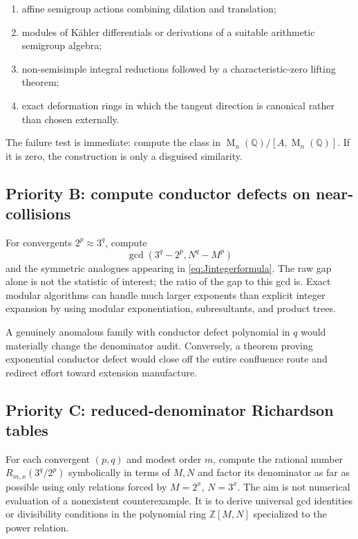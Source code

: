 \documentclass[11pt,oneside]{article}
\theoremstyle{definition}
\theoremstyle{remark}
\newcommand{\Z}{\mathbb Z}
\newcommand{\Q}{\mathbb Q}
\newcommand{\Mat}{\operatorname{M}}
\begin{document}
\begin{enumerate}
\item affine semigroup actions combining dilation and translation;
\item modules of K\"ahler differentials or derivations of a suitable arithmetic semigroup
algebra;
\item non-semisimple integral reductions followed by a characteristic-zero lifting theorem;
\item exact deformation rings in which the tangent direction is canonical rather than chosen
externally.
\end{enumerate}

The failure test is immediate: compute the class in
$\Mat_n(\Q)/[A,\Mat_n(\Q)]$.  If it is zero, the construction is only a disguised similarity.

\subsection{Priority B: compute conductor defects on near-collisions}

For convergents $2^p\approx3^q$, compute
\begin{equation}
 \gcd(3^q-2^p,N^q-M^p)
 \label{eq:crossgcd}
\end{equation}
and the symmetric analogues appearing in \eqref{eq:Jintegerformula}.  The raw gap alone is not
the statistic of interest; the ratio of the gap to this gcd is.  Exact modular algorithms can
handle much larger exponents than explicit integer expansion by using modular exponentiation,
subresultants, and product trees.

A genuinely anomalous family with conductor defect polynomial in $q$ would materially change
the denominator audit.  Conversely, a theorem proving exponential conductor defect would
close off the entire confluence route and redirect effort toward extension manufacture.

\subsection{Priority C: reduced-denominator Richardson tables}

For each convergent $(p,q)$ and modest order $m$, compute the rational number
$R_{m,x}(3^q/2^p)$ symbolically in terms of $M,N$ and factor its denominator as far as possible
using only relations forced by $M=2^x$, $N=3^x$.  The aim is not numerical evaluation of a
nonexistent counterexample.  It is to derive universal gcd identities or divisibility
conditions in the polynomial ring $\Z[M,N]$ specialized to the power relation.
\end{document}
